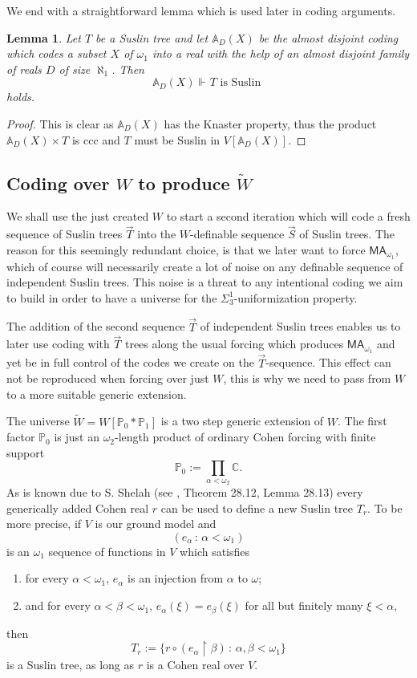\documentclass[a4paper,12pt]{article}
\newtheorem{lemma}[theorem]{Lemma}
\newcommand{\forceP}{\mathbb{P}}
\newcommand{\MA}{\mathsf{MA}_{\omega_1}}
\begin{document}
We end with a straightforward lemma which is used later in coding arguments.

\begin{lemma}\label{a.d.coding preserves Suslin trees}
 Let $T$ be a Suslin tree and let $\mathbb{A}_D(X)$ be the almost disjoint coding which codes
 a subset $X$ of $\omega_1$ into a real with the help of an almost disjoint family
 of reals $D$ of size $\aleph_1$. Then $$\mathbb{A}_{D}(X) \Vdash_{} T \text{ is Suslin }$$
 holds.
\end{lemma}
\begin{proof}
 This is clear as $\mathbb{A}_{D}(X)$ has the Knaster property, thus the product $\mathbb{A}_{D}(X) \times T$ is ccc and $T$ must be Suslin in $V[{\mathbb{A}_{D}(X)}]$. 
\end{proof}

\subsection{Coding over $W$ to produce $\tilde{W}$}
We shall use the just created $W$ to start a second iteration which will code a fresh sequence of Suslin trees $\vec{T}$ into the $W$-definable sequence $\vec{S}$ of Suslin trees. 
The reason for this seemingly redundant choice, is that we later want to force $\MA$, which of course will necessarily create a lot of noise on any definable sequence of independent Suslin trees. This noise is a threat to any intentional coding we aim to build in order to have a universe for the $\Sigma^1_3$-uniformization property.

The addition of the second sequence $\vec{T}$ of independent Suslin trees enables us to later use coding with $\vec{T}$ trees along the usual forcing which produces $\MA$ and yet be in full control of the codes we create on the $\vec{T}$-sequence. This effect can not be reproduced when forcing over just $W$, this is why we need to pass from $W$ to a more suitable generic extension.

The universe $\tilde{W}=W[\forceP_0 \ast \forceP_1]$ is a two step generic extension of $W$. The first factor $\forceP_0$ is just an $\omega_2$-length product of ordinary Cohen forcing with finite support
\[\forceP_0:= \prod_{\alpha < \omega_2} \mathbb{C}. \]
As is known due to S. Shelah (see \cite{Jech}, Theorem 28.12, Lemma 28.13) every generically added Cohen real $r$ can be used to define a new Suslin tree $T_r$. To be more precise, if $V$ is our ground model and
\[ (e_{\alpha} \, : \, \alpha < \omega_1) \] is an $\omega_1$ sequence of functions in $V$ which satisfies
\begin{enumerate}
\item for every $\alpha < \omega_1$, $e_{\alpha}$ is an injection from $\alpha$ to $\omega$;
\item and for every $\alpha < \beta < \omega_1$, $e_{\alpha} (\xi)=e_{\beta} (\xi)$ for all but finitely many $\xi < \alpha$,
\end{enumerate}
then
\[ T_r :=\{ r \circ (e_{\alpha} \upharpoonright \beta) \, : \, \alpha,\beta < \omega_1\} \]
 is a Suslin tree, as long as $r$ is a Cohen real over $V$.
 
\end{document}
